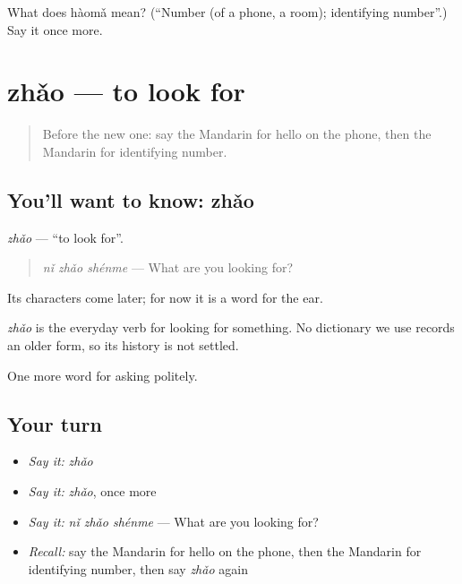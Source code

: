 \begin{tcolorbox}[breakable,colback=teal!4,colframe=teal!35!black,title={Before you move on}]
What does hàomǎ mean? (\textquotedblleft{}Number (of a phone, a room); identifying number\textquotedblright{}.) Say it once more.
\end{tcolorbox}
\section[zhǎo]{zhǎo — to look for}

\label{lesson:ZH-C63-zhao}



\begin{quote}
Before the new one: say the Mandarin for hello on the phone, then the Mandarin for identifying number.
\end{quote}

\subsection*{You'll want to know: zhǎo}
\emph{zhǎo} — \textquotedblleft{}to look for\textquotedblright{}.

\begin{quote}
\emph{nǐ zhǎo shénme} — What are you looking for?
\end{quote}

Its characters come later; for now it is a word for the ear.

\begin{cousinweb}
\emph{zhǎo} is the everyday verb for looking for something. No dictionary we use records an older form, so its history is not settled.
\end{cousinweb}

\begin{grammarlens}[title={What you've built}]
One more word for asking politely.
\end{grammarlens}

\subsection*{Your turn}
\begin{itemize}
\raggedright
  \item \emph{Say it:} \emph{zhǎo}
  \item \emph{Say it:} \emph{zhǎo}, once more
  \item \emph{Say it:} \emph{nǐ zhǎo shénme} — What are you looking for?
  \item \emph{Recall:} say the Mandarin for hello on the phone, then the Mandarin for identifying number, then say \emph{zhǎo} again
\end{itemize}


